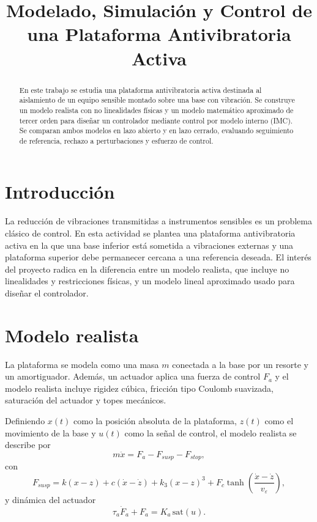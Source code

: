 \documentclass[conference]{IEEEtran}
\title{Modelado, Simulaci\'on y Control de una Plataforma Antivibratoria Activa}
\author{
\IEEEauthorblockN{Nombre 1, Nombre 2}
\IEEEauthorblockA{
Universidad de los Andes, Bogot\'a, Colombia\\
correo1@uniandes.edu.co, correo2@uniandes.edu.co}
}
\begin{document}
\maketitle

\begin{abstract}
En este trabajo se estudia una plataforma antivibratoria activa destinada al aislamiento de un equipo sensible montado sobre una base con vibraci\'on. Se construye un modelo realista con no linealidades f\'isicas y un modelo matem\'atico aproximado de tercer orden para dise\~nar un controlador mediante control por modelo interno (IMC). Se comparan ambos modelos en lazo abierto y en lazo cerrado, evaluando seguimiento de referencia, rechazo a perturbaciones y esfuerzo de control.
\end{abstract}

\section{Introducci\'on}
La reducci\'on de vibraciones transmitidas a instrumentos sensibles es un problema cl\'asico de control. En esta actividad se plantea una plataforma antivibratoria activa en la que una base inferior est\'a sometida a vibraciones externas y una plataforma superior debe permanecer cercana a una referencia deseada. El inter\'es del proyecto radica en la diferencia entre un modelo realista, que incluye no linealidades y restricciones f\'isicas, y un modelo lineal aproximado usado para dise\~nar el controlador.

\section{Modelo realista}
La plataforma se modela como una masa $m$ conectada a la base por un resorte y un amortiguador. Adem\'as, un actuador aplica una fuerza de control $F_a$ y el modelo realista incluye rigidez c\'ubica, fricci\'on tipo Coulomb suavizada, saturaci\'on del actuador y topes mec\'anicos.

Definiendo $x(t)$ como la posici\'on absoluta de la plataforma, $z(t)$ como el movimiento de la base y $u(t)$ como la se\~nal de control, el modelo realista se describe por
\begin{equation}
m\ddot{x}=F_a-F_{susp}-F_{stop},
\end{equation}
con
\begin{equation}
F_{susp}=k(x-z)+c(\dot{x}-\dot{z})+k_3(x-z)^3+F_c\tanh\left(\frac{\dot{x}-\dot{z}}{v_\varepsilon}\right),
\end{equation}
y din\'amica del actuador
\begin{equation}
\tau_a \dot{F}_a + F_a = K_a \,\mathrm{sat}(u).
\end{equation}
\end{document}
